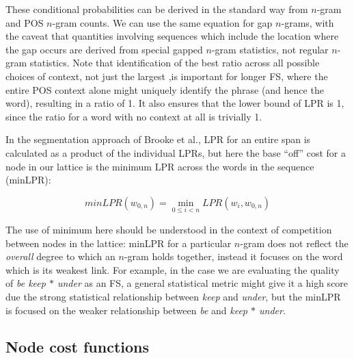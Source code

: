 \documentclass[11pt,letterpaper]{article}
\makeatletter
\def \al {al.\@ }
\newcommand{\gap}{$*$\xspace}
\newcommand{\ex}[1]{\textit{#1}\xspace}
\makeatother
\begin{document}
These conditional probabilities can be derived in the standard way from $n$-gram and POS $n$-gram counts. We can use the same equation for gap $n$-grams, with the caveat that quantities involving sequences which include the location where the gap occurs are derived from special gapped $n$-gram statistics, not regular $n$-gram statistics. Note that identification of the best ratio across all possible choices of context, not just the largest ,is important for longer FS, where the entire POS context alone might uniquely identify the phrase (and hence the word), resulting in a ratio of 1. It also ensures that the lower bound of LPR is 1, since the ratio for a word with no context at all is trivially 1.

In the segmentation approach of Brooke et \al {}, LPR for an entire span is calculated as a product of the individual LPRs, but here the base ``off'' cost for a node in our lattice is the minimum LPR across the words in the sequence (minLPR):

\begin{displaymath}
minLPR(w_{0,n}) = \min_{0 \leq i < n }{LPR(w_i,w_{0,n})}
\end{displaymath}

The use of minimum here should be understood in the context of competition between nodes in the lattice: minLPR for a particular $n$-gram does not reflect the \emph{overall}
degree to which an $n$-gram holds together, instead it focuses on the word which is its weakest link. For example, in the case we are evaluating the quality of \ex{be keep \gap under} as an FS, a general statistical metric might give it a high score due the strong statistical relationship between \ex{keep} and \ex{under}, but the minLPR is focused on the weaker relationship between \ex{be} and \ex{keep \gap under}.


\subsection{Node cost functions}
\end{document}
